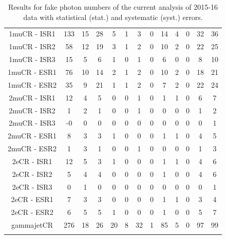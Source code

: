 \documentclass[11pt,a4paper,twoside,openright]{book}
\begin{document}
\begin{table}[hbtp!]
{\begin{tabular}{ccccccccccccc}
1muCR - ISR1 & 133 & 15 & 28 & 5 & 1 & 3 & 0 & 14 & 4 & 0 & 32 & 36 \\
1muCR - ISR2 & 58 & 12 & 19 & 3 & 1 & 2 & 0 & 10 & 2 & 0 & 22 & 25 \\
1muCR - ISR3 & 15 & 5 & 6 & 1 & 0 & 1 & 0 & 6 & 0 & 0 & 8 & 10 \\
1muCR - ESR1 & 76 & 10 & 14 & 2 & 1 & 2 & 0 & 10 & 2 & 0 & 18 & 21 \\
1muCR - ESR2 & 35 & 9 & 21 & 1 & 1 & 2 & 0 & 7 & 2 & 0 & 22 & 24 \\
2muCR - ISR1 & 12 & 4 & 5 & 0 & 0 & 1 & 0 & 1 & 1 & 0 & 6 & 7 \\
2muCR - ISR2 & 1 & 2 & 1 & 0 & 0 & 1 & 0 & 0 & 0 & 0 & 1 & 2 \\
2muCR - ISR3 & -0 & 0 & 0 & 0 & 0 & 0 & 0 & 0 & 0 & 0 & 0 & 1 \\
2muCR - ESR1 & 8 & 3 & 3 & 1 & 0 & 0 & 0 & 1 & 1 & 0 & 4 & 5 \\
2muCR - ESR2 & 1 & 3 & 1 & 0 & 0 & 1 & 0 & 0 & 0 & 0 & 1 & 3 \\
2eCR - ISR1 & 12 & 5 & 3 & 1 & 0 & 0 & 0 & 1 & 1 & 0 & 4 & 6 \\
2eCR - ISR2 & 5 & 4 & 4 & 0 & 0 & 0 & 0 & 1 & 0 & 0 & 4 & 6 \\
2eCR - ISR3 & 0 & 1 & 0 & 0 & 0 & 0 & 0 & 0 & 0 & 0 & 0 & 1 \\
2eCR - ESR1 & 7 & 3 & 3 & 0 & 0 & 0 & 0 & 1 & 1 & 0 & 3 & 4 \\
2eCR - ESR2 & 6 & 5 & 5 & 1 & 0 & 0 & 0 & 1 & 0 & 0 & 5 & 7 \\
gammajetCR & 276 & 18 & 26 & 20 & 8 & 32 & 1 & 85 & 5 & 0 & 97 & 99 \\ \hhline{=============}
\end{tabular}%
}
\caption{Results for fake photon numbers of the current analysis of 2015-16 data with statistical (stat.) and systematic (syst.) errors.}
\label{tab:fake_photons}
\end{table}
\end{document}
